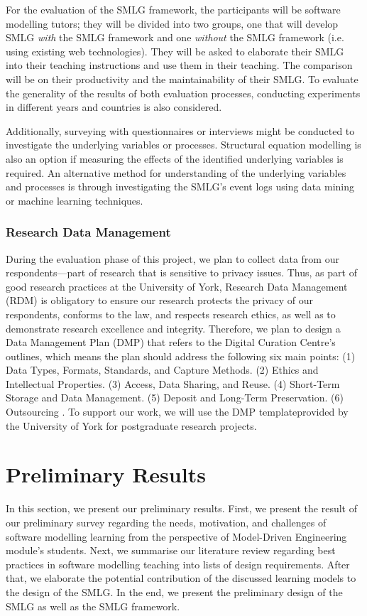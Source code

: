 \documentclass[12pt, a4paper]{report}
\begin{document}
{For the evaluation of the SMLG framework, the participants will be software modelling tutors; they will be divided into two groups, one that will develop SMLG \emph{with} the SMLG framework and one \emph{without} the SMLG framework (i.e. using existing web technologies). They will be asked to elaborate their SMLG into their teaching instructions and use them in their teaching. The comparison will be on their productivity and the maintainability of their SMLG. To evaluate the generality of the results of both evaluation processes, conducting experiments in different years and countries is also considered.

Additionally, surveying with questionnaires or interviews might be conducted to investigate the underlying variables or processes. Structural equation modelling \cite{hair2016primer} is also an option if measuring the effects of the identified underlying variables is required. An alternative method for understanding of the underlying variables and processes is through investigating the SMLG's event logs using data mining or machine learning techniques.

\subsection{Research Data Management}
During the evaluation phase of this project, we plan to collect data from our respondents---part of research that is sensitive to privacy issues. Thus, as part of good research practices at the University of York\footnotemark {}, Research Data Management (RDM) is obligatory to ensure our research protects the privacy of our respondents, conforms to the law, and respects research ethics, as well as to demonstrate research excellence and integrity. Therefore, we plan to design a Data Management Plan (DMP) that refers to the Digital Curation Centre's outlines, which means the plan should address the following six main points: (1) Data Types, Formats, Standards, and Capture Methods. (2) Ethics and Intellectual Properties. (3) Access, Data Sharing, and Reuse. (4) Short-Term Storage and Data Management. (5) Deposit and Long-Term Preservation. (6) Outsourcing \cite{jones2011develop}. To support our work, we will use the DMP template\footnotemark[\value{footnote}] provided by the University of York for postgraduate research projects.
  
\chapter{Preliminary Results}
In this section, we present our preliminary results. First, we present the result of our preliminary survey regarding the needs, motivation, and challenges of software modelling learning from the perspective of Model-Driven Engineering module's students. Next, we summarise our literature review regarding best practices in software modelling teaching into lists of design requirements. After that, we elaborate the potential contribution of the discussed learning models to the design of the SMLG. In the end, we present the preliminary design of the SMLG as well as the SMLG framework. 

}
\end{document}
